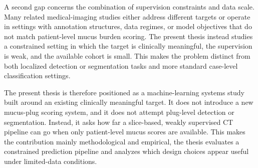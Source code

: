 A second gap concerns the combination of supervision constraints and data scale. Many related medical-imaging studies either address different targets or operate in settings with annotation structures, data regimes, or model objectives that do not match patient-level mucus burden scoring. The present thesis instead studies a constrained setting in which the target is clinically meaningful, the supervision is weak, and the available cohort is small. This makes the problem distinct from both localized detection or segmentation tasks and more standard case-level classification settings.

The present thesis is therefore positioned as a machine-learning systems study built around an existing clinically meaningful target. It does not introduce a new mucus-plug scoring system, and it does not attempt plug-level detection or segmentation. Instead, it asks how far a slice-based, weakly supervised CT pipeline can go when only patient-level mucus scores are available. This makes the contribution mainly methodological and empirical, the thesis evaluates a constrained prediction pipeline and analyzes which design choices appear useful under limited-data conditions.
